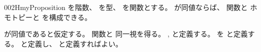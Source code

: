\documentclass[index]{subfiles}
\begin{document}
\begin{myBlock}{002H}{myProposition}
  を階数、
  を型、
  を関数とする。
  が同値ならば、
  関数と
  ホモトピーと
  を構成できる。
\end{myBlock}
\begin{myProof}
  が同値であると仮定する。
  関数と
  同一視を得る。
  ,
  と定義する。
  を
  と定義する。
  と定義し、
  と定義すればよい。
\end{myProof}
\end{document}
